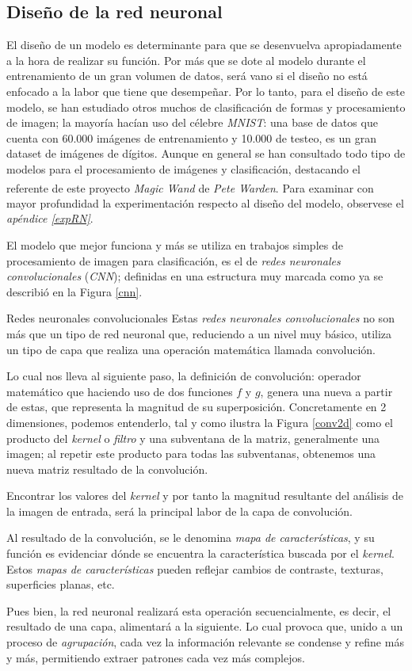 \subsection{Diseño de la red neuronal}
El diseño de un modelo es determinante para que se desenvuelva apropiadamente
a la hora de realizar su función. Por más que se dote al modelo durante el
entrenamiento de un gran volumen de datos, será vano si el diseño no está enfocado
a la labor que tiene que desempeñar. Por lo tanto, para el diseño de este modelo,
se han estudiado otros muchos de clasificación de formas y procesamiento de imagen; la
mayoría hacían uso del célebre \textit{MNIST}: una base de datos que cuenta con
60.000 imágenes de entrenamiento y 10.000 de testeo, es un gran dataset de imágenes
de dígitos. Aunque en general se han consultado todo tipo de modelos para el
procesamiento de imágenes y clasificación, destacando el referente de este proyecto
\textit{Magic Wand}\textsuperscript{\cite{petewardenmw}} de \textit{Pete Warden}.
Para examinar con mayor profundidad la experimentación respecto al diseño del modelo,
observese el \textit{apéndice \ref{expRN}}.

El modelo que mejor funciona y más se utiliza en trabajos simples de procesamiento
de imagen para clasificación, es el de \textit{redes neuronales convolucionales}
(\textit{CNN}); definidas en una estructura muy marcada como ya se describió
en la Figura \ref{cnn}.
\begin{teoria}{Redes neuronales convolucionales}
Estas \textit{redes neuronales convolucionales}
no son más que un tipo de red neuronal que, reduciendo a un nivel muy básico,
utiliza un tipo de capa que realiza una operación matemática llamada convolución.

Lo cual nos lleva al siguiente paso, la definición de convolución: operador
matemático que haciendo uso de dos funciones $f$ y $g$, genera una nueva
a partir de estas, que representa la magnitud de su superposición.
Concretamente en 2 dimensiones, podemos entenderlo, tal y como ilustra la
Figura \ref{conv2d} como el producto del \textit{kernel} o \textit{filtro}
y una subventana de la matriz, generalmente una imagen; al repetir este producto
para todas las subventanas, obtenemos una nueva matriz resultado de la convolución.

Encontrar los valores del \textit{kernel} y por tanto la magnitud resultante
del análisis de la imagen de entrada, será la principal labor de la capa de
convolución.

Al resultado de la convolución, se le denomina \textit{mapa de características},
y su función es evidenciar dónde se encuentra la característica buscada por el
\textit{kernel}. Estos \textit{mapas de características} pueden reflejar
cambios de contraste, texturas, superficies planas, etc.

Pues bien, la red neuronal realizará esta operación secuencialmente, es decir,
el resultado de una capa, alimentará a la siguiente. Lo cual provoca que,
unido a un proceso de \textit{agrupación}, cada vez la información relevante
se condense y refine más y más, permitiendo extraer patrones cada vez más
complejos.
\end{teoria}\newpage

